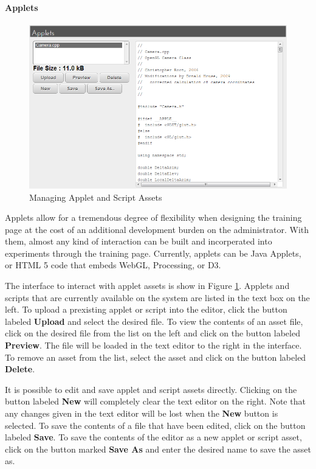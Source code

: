 \documentclass[article]{ij4uq}              %
\begin{document}
\paragraph{Applets}

\begin{figure}[htb]
 \centering
 \includegraphics[width=5.0in]{figures/manage_applets.png}
 \caption{Managing Applet and Script Assets}
 \label{fig:manageApp}
\end{figure}
\FloatBarrier

Applets allow for a tremendous degree of flexibility when designing the training page at the cost of an additional development burden on the administrator.  With them, almost any kind of interaction can be built and incorperated into experiments through the training page.  Currently, applets can be Java Applets, or HTML 5 code that embeds WebGL, Processing, or D3.

The interface to interact with applet assets is show in Figure \ref{fig:manageApp}.  Applets and scripts that are currently available on the system are listed in the text box on the left. To upload a prexisting applet or script into the editor, click the button labeled \textbf{Upload} and select the desired file.  To view the contents of an asset file, click on the desired file from the list on the left and click on the button labeled \textbf{Preview}.  The file will be loaded in the text editor to the right in the interface.  To remove an asset from the list, select the asset and click on the button labeled \textbf{Delete}.

It is possible to edit and save applet and script assets directly.  Clicking on the button labeled \textbf{New} will completely clear the text editor on the right.  Note that any changes given in the text editor will be lost when the \textbf{New} button is selected.  To save the contents of a file that have been edited, click on the button labeled \textbf{Save}.  To save the contents of the editor as a new applet or script asset, click on the button marked \textbf{Save As} and enter the desired name to save the asset as.
\end{document}
